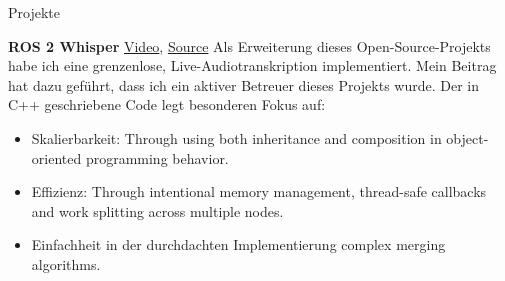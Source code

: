 \begin{rubric}{Projekte}

\entry*[2024] \textbf{ROS 2 Whisper} \hfill \href{https://github.com/ros-ai/ros2_whisper/blob/main/doc/harry_potter_sample.gif}{Video}, \href{https://github.com/ros-ai/ros2_whisper}{\faGithub Source} \newline  
Als Erweiterung dieses Open-Source-Projekts habe ich eine grenzenlose, Live-Audiotranskription implementiert. Mein Beitrag hat dazu geführt, dass ich ein aktiver Betreuer dieses Projekts wurde. Der in C++ geschriebene Code legt besonderen Fokus auf: \newline  
\vspace{\CVItemizeHeaderSpacing} \begin{itemize}  
	\setlength{\itemsep}{\CVItemizeSpacing}  
	\item Skalierbarkeit:  Through using both inheritance and composition in object-oriented programming behavior.
	\item Effizienz:  Through intentional memory management, thread-safe callbacks and work splitting across multiple nodes.
	\item Einfachheit in der durchdachten Implementierung complex merging algorithms.
\end{itemize}  
\begin{comment}
\entry*[2024] \textbf{ROS 2 Computer Vision} \hfill \href{https://github.com/NathanCorral/ROS-HF-Vision/blob/main/doc/gifs/ex_german_roads.gif}{Video}, \href{https://github.com/NathanCorral/ROS-HF-Vision/tree/main}{\faGithub Source} \newline  
Das Ausführen mehrerer Computer-Vision-Modelle (DETR, Maskformer), die für verschiedene Datensätze/Aufgaben trainiert wurden, auf einem Live-Kamerastream stellt mehrere Implementierungsherausforderungen dar. Dieses Python-Repository bietet eine Lösung für: \newline  
\vspace{\CVItemizeHeaderSpacing} \begin{itemize}  
	\setlength{\itemsep}{\CVItemizeSpacing}  
	\item Das Herunterladen und Ausführen von State-of-the-Art-Modellen aus Hugging Face als asynchrone ROS 2 Nodes.  
	\item Das Hosten eines Label Server, um Modell-Ausgaben in einer globalen Datenbank neu zu adressieren.  
	\item Die Anzeige von Segmentation Masks und Bounding Boxes als Matplotlib Animations.  
	\item Das Veröffentlichen von Datensatzbildern zur wiederholbaren Evaluierung von CV-Modellen.  
\end{itemize}  


\end{comment}
\end{rubric}
